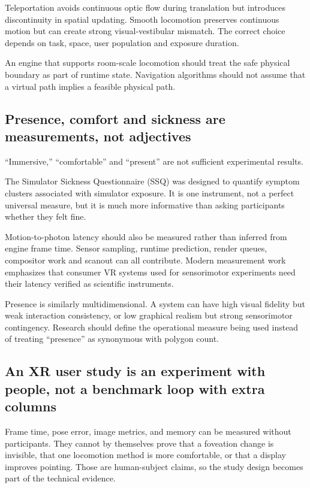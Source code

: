 Teleportation avoids continuous optic flow during translation but introduces discontinuity in spatial updating. Smooth locomotion preserves continuous motion but can create strong visual-vestibular mismatch. The correct choice depends on task, space, user population and exposure duration.

An engine that supports room-scale locomotion should treat the safe physical boundary as part of runtime state. Navigation algorithms should not assume that a virtual path implies a feasible physical path.

\subsection{Presence, comfort and sickness are measurements, not adjectives}\label{04-visual-computing-ii-ch035-presence-comfort-and-sickness-are-measurements-not-adjectives}

``Immersive,'' ``comfortable'' and ``present'' are not sufficient experimental results.

The Simulator Sickness Questionnaire (SSQ) was designed to quantify symptom clusters associated with simulator exposure. It is one instrument, not a perfect universal measure, but it is much more informative than asking participants whether they felt fine.

Motion-to-photon latency should also be measured rather than inferred from engine frame time. Sensor sampling, runtime prediction, render queues, compositor work and scanout can all contribute. Modern measurement work emphasizes that consumer VR systems used for sensorimotor experiments need their latency verified as scientific instruments.

Presence is similarly multidimensional. A system can have high visual fidelity but weak interaction consistency, or low graphical realism but strong sensorimotor contingency. Research should define the operational measure being used instead of treating ``presence'' as synonymous with polygon count.

\subsection{An XR user study is an experiment with people, not a benchmark loop with extra columns}\label{04-visual-computing-ii-ch035-an-xr-user-study-is-an-experiment-with-people-not-a-benchmark-loop-with-extra-columns}

Frame time, pose error, image metrics, and memory can be measured without participants. They cannot by themselves prove that a foveation change is invisible, that one locomotion method is more comfortable, or that a display improves pointing. Those are human-subject claims, so the study design becomes part of the technical evidence.

